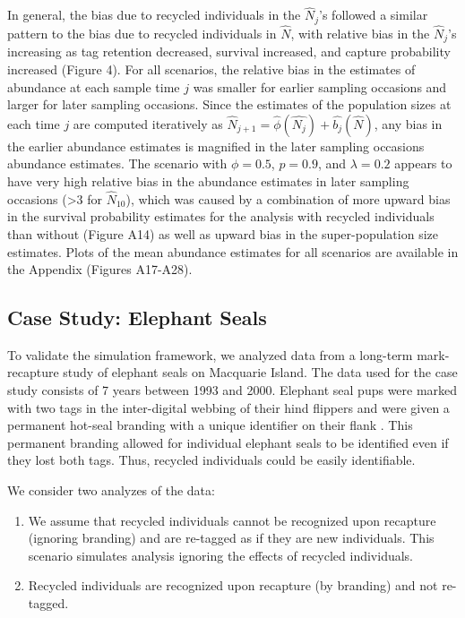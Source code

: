 \documentclass[]{article}
\begin{document}
In general, the bias due to recycled individuals in the \(\hat{N}_j\)'s
followed a similar pattern to the bias due to recycled individuals in
\(\hat{N}\), with relative bias in the \(\hat{N}_j\)'s increasing as tag
retention decreased, survival increased, and capture probability
increased (Figure 4). For all scenarios, the relative bias in the
estimates of abundance at each sample time \(j\) was smaller for earlier
sampling occasions and larger for later sampling occasions. Since the
estimates of the population sizes at each time \(j\) are computed
iteratively as
\(\hat{N}_{j+1}=\hat{\phi}(\hat{N_j})+\hat{b_j}(\hat{N})\), any bias in
the earlier abundance estimates is magnified in the later sampling
occasions abundance estimates. The scenario with \(\phi=0.5\),
\(p=0.9\), and \(\lambda=0.2\) appears to have very high relative bias
in the abundance estimates in later sampling occasions (\textgreater{}3
for \(\hat{N}_{10}\)), which was caused by a combination of more upward
bias in the survival probability estimates for the analysis with recycled
individuals than without (Figure A14) as well as upward bias in the
super-population size estimates. Plots of the mean abundance estimates
for all scenarios are available in the Appendix (Figures A17-A28).

\subsection{Case Study: Elephant
Seals}\label{case-study-elephant-seals-1}


To validate the simulation framework, we analyzed data from a long-term
mark-recapture study of elephant seals on Macquarie Island. The data
used for the case study consists of 7 years between 1993 and 2000.
Elephant seal pups were marked with two tags in the inter-digital
webbing of their hind flippers and were given a permanent hot-seal
branding with a unique identifier on their flank \citep{McMahon:2009}. This
permanent branding allowed for individual elephant seals to be
identified even if they lost both tags. Thus, recycled individuals could
be easily identifiable.

We consider two analyzes of the data:

\begin{enumerate}
\def\labelenumi{\arabic{enumi}.}
\item
  We assume that recycled individuals cannot be recognized upon
  recapture (ignoring branding) and are re-tagged as if they are new
  individuals. This scenario simulates analysis ignoring the effects of
  recycled individuals.
\item
  Recycled individuals are recognized upon recapture (by branding) and
  not re-tagged.
\end{enumerate}
\end{document}
